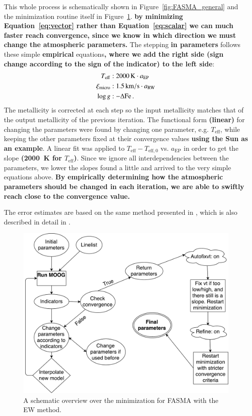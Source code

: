 \documentclass{aa}
\begin{document}
This whole process is schematically shown in Figure~\ref{fig:FASMA_general} and
the minimization routine itself in Figure~\ref{fig:FASMA_minimization}. {\bf by
minimizing Equation~\ref{eq:vector} rather than Equation~\ref{eq:scalar} we can
much faster reach convergence, since we know in which direction we must change
the atmospheric parameters.} The stepping {\bf in parameters} follows these
simple {\bf empirical} equations{\bf, where we add the right side (sign change
according to the sign of the indicator) to the left side}:
\begin{align}
    T_\mathrm{eff}     &: \SI{2000}{K} \cdot a_\mathrm{EP}   \\
    \xi_\mathrm{micro} &: \SI{1.5}{km/s} \cdot a_\mathrm{RW} \\
    \log g             &: -\Delta\ion{Fe}.
\end{align}
The metallicity is corrected at each step so the input metallicity matches that
of the output metallicity of the previous iteration. The functional form {\bf
(linear)} for changing the parameters were found by changing one parameter, e.g.
$T_\mathrm{eff}$, while keeping the other parameters fixed at their convergence
values {\bf using the Sun as an example}. A linear fit was applied to
$T_\mathrm{eff} - T_\mathrm{eff,0}$ vs. $a_\mathrm{EP}$ in order to get the
slope {\bf (\SI{2000}{K} for $T_\mathrm{eff}$)}. Since we ignore all
interdependencies between the parameters, we lower the slopes found a little and
arrived to the very simple equations above. {\bf By empirically determining how
the atmospheric parameters should be changed in each iteration, we are able to
swiftly reach close to the convergence value.}

The error estimates are based on the same method presented in
\citet{Gonzalez2000}, which is also described in detail in
\citet{Santos2003,Andreasen2016}.

\begin{figure}[tpb]
    \centering
    \includegraphics[width=1.0\linewidth,natwidth=700,natheight=650]{figures/FASMA_minimization.pdf}
    \caption{A schematic overview over the minimization for FASMA with the
    EW method.}
    \label{fig:FASMA_minimization}
\end{figure}
\end{document}
